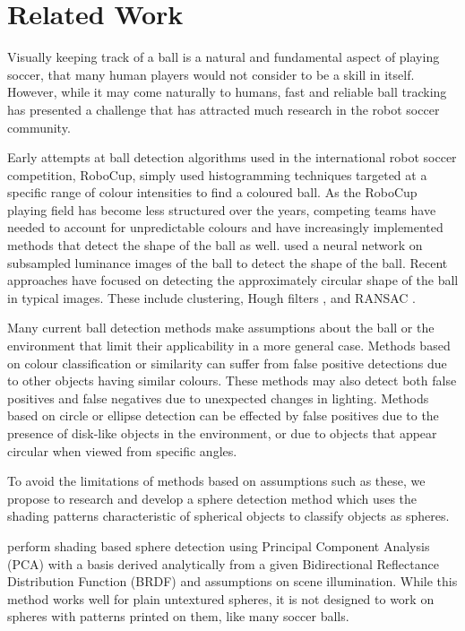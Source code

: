 \documentclass{llncs}
\begin{document}
    \section{Related Work} {
    \label{sec:related_work}

        Visually keeping track of a ball is a natural and fundamental aspect of playing soccer, that many human players would not consider to be a skill in itself. However, while it may come naturally to humans, fast and reliable ball tracking has presented a challenge that has attracted much research in the robot soccer community.

        Early attempts at ball detection algorithms used in the international robot soccer competition, RoboCup, simply used histogramming techniques targeted at a specific range of colour intensities to find a coloured ball. As the RoboCup playing field has become less structured over the years, competing teams have needed to account for unpredictable colours and have increasingly implemented methods that detect the shape of the ball as well. \citet{schulz2007ball} used a neural network on subsampled luminance images of the ball to detect the shape of the ball. Recent approaches have focused on detecting the approximately circular shape of the ball in typical images. These include clustering, Hough filters \citep{li2013survey}, and RANSAC \citep{annable2013nubots}.

        Many current ball detection methods make assumptions about the ball or the environment that limit their applicability in a more general case. Methods based on colour classification or similarity can suffer from false positive detections due to other objects having similar colours. These methods may also detect both false positives and false negatives due to unexpected changes in lighting. Methods based on circle or ellipse detection can be effected by false positives due to the presence of disk-like objects in the environment, or due to objects that appear circular when viewed from specific angles.

        To avoid the limitations of methods based on assumptions such as these, we propose to research and develop a sphere detection method which uses the shading patterns characteristic of spherical objects to classify objects as spheres.

        \citet{nillius2008shading} perform shading based sphere detection using Principal Component Analysis (PCA) with a basis derived analytically from a given Bidirectional Reflectance Distribution Function (BRDF) and assumptions on scene illumination. While this method works well for plain untextured spheres, it is
        not designed to work on spheres with patterns printed on them, like many soccer balls.

}
\end{document}
